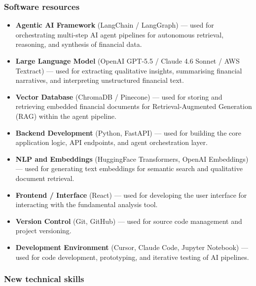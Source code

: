 \subsubsection{Software resources}


\begin{itemize}
    \item \textbf{Agentic AI Framework} (LangChain / LangGraph) --- used 
    for orchestrating multi-step AI agent pipelines for autonomous 
    retrieval, reasoning, and synthesis of financial data.

    \item \textbf{Large Language Model} (OpenAI GPT-5.5 / Claude 4.6 Sonnet / AWS Textract) 
    --- used for extracting qualitative insights, summarising financial 
    narratives, and interpreting unstructured financial text.

    \item \textbf{Vector Database} (ChromaDB / Pinecone) --- used for 
    storing and retrieving embedded financial documents for 
    Retrieval-Augmented Generation (RAG) within the agent pipeline.

    \item \textbf{Backend Development} (Python, FastAPI) --- used for 
    building the core application logic, API endpoints, and agent 
    orchestration layer.

    \item \textbf{NLP and Embeddings} (HuggingFace Transformers, OpenAI 
    Embeddings) --- used for generating text embeddings for semantic 
    search and qualitative document retrieval.

    \item \textbf{Frontend / Interface} (React) --- used for 
    developing the user interface for interacting with the 
    fundamental analysis tool.

    \item \textbf{Version Control} (Git, GitHub) --- used for source code 
    management and project versioning.

    \item \textbf{Development Environment} (Cursor, Claude Code, Jupyter Notebook) --- 
    used for code development, prototyping, and iterative testing 
    of AI pipelines.
\end{itemize}

\subsubsection{New technical skills}

